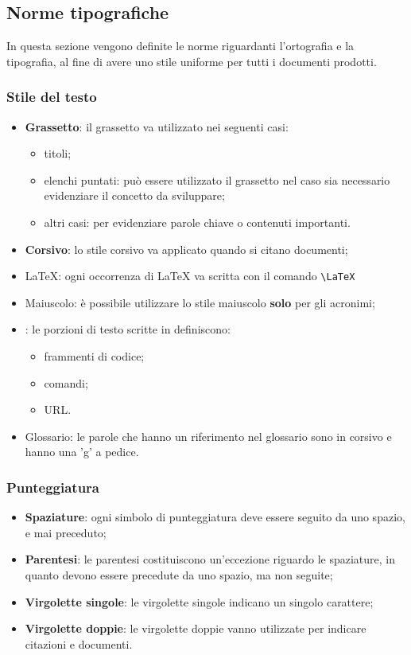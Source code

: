 	\subsection{Norme tipografiche}
	In questa sezione vengono definite le norme riguardanti l'ortografia e la tipografia, al fine di avere uno stile uniforme per tutti i documenti prodotti.
		\subsubsection{Stile del testo}
		\begin{itemize}
			\item \textbf{Grassetto}: il grassetto va utilizzato nei seguenti casi:
			\begin{itemize}
				\item titoli;
				\item elenchi puntati: può essere utilizzato il grassetto nel caso sia necessario evidenziare il concetto da sviluppare;
				\item altri casi: per evidenziare parole chiave o contenuti importanti.
			\end{itemize}
			\item \textbf{Corsivo}: lo stile corsivo va applicato quando si citano documenti;
			\item \LaTeX: ogni occorrenza di \LaTeX{} va scritta con il comando \texttt{\textbackslash LaTeX}
			\item Maiuscolo: è possibile utilizzare lo stile maiuscolo \textbf{solo} per gli acronimi;
			\item {}: le porzioni di testo scritte in  definiscono:
			\begin{itemize}
				\item frammenti di codice;
				\item comandi;
				\item URL.
			\end{itemize} 
			\item Glossario: le parole che hanno un riferimento nel glossario sono in corsivo e hanno una 'g' a pedice.
		\end{itemize}
		\subsubsection{Punteggiatura}
		\begin{itemize}
			\item \textbf{Spaziature}: ogni simbolo di punteggiatura deve essere seguito da uno spazio, e mai preceduto;
			\item \textbf{Parentesi}: le parentesi costituiscono un'eccezione riguardo le spaziature, in quanto devono essere precedute da uno spazio, ma non seguite;
			\item \textbf{Virgolette singole}: le virgolette singole indicano un singolo carattere;
			\item \textbf{Virgolette doppie}: le virgolette doppie vanno utilizzate per indicare citazioni e documenti.
		\end{itemize}
